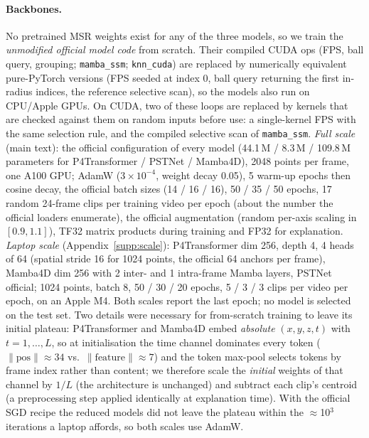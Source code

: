 \paragraph{Backbones.}
No pretrained MSR weights exist for any of the three models, so we train the \emph{unmodified official model code} from scratch. Their compiled CUDA ops (FPS, ball query, grouping; \texttt{mamba\_ssm}; \texttt{knn\_cuda}) are replaced by numerically equivalent pure-PyTorch versions (FPS seeded at index 0, ball query returning the first in-radius indices, the reference selective scan), so the models also run on CPU/Apple GPUs. On CUDA, two of these loops are replaced by kernels that are checked against them on random inputs before use: a single-kernel FPS with the same selection rule, and the compiled selective scan of \texttt{mamba\_ssm}. \emph{Full scale} (main text): the official configuration of every model (44.1\,M / 8.3\,M / 109.8\,M parameters for P4Transformer / PSTNet / Mamba4D), 2048 points per frame, one A100 GPU; AdamW ($3{\times}10^{-4}$, weight decay 0.05), 5 warm-up epochs then cosine decay, the official batch sizes (14 / 16 / 16), 50 / 35 / 50 epochs, 17 random 24-frame clips per training video per epoch (about the number the official loaders enumerate), the official augmentation (random per-axis scaling in $[0.9,1.1]$), TF32 matrix products during training and FP32 for explanation. \emph{Laptop scale} (Appendix~\ref{supp:scale}): P4Transformer dim 256, depth 4, 4 heads of 64 (spatial stride 16 for 1024 points, \ie the official 64 anchors per frame), Mamba4D dim 256 with 2 inter- and 1 intra-frame Mamba layers, PSTNet official; 1024 points, batch 8, 50 / 30 / 20 epochs, 5 / 3 / 3 clips per video per epoch, on an Apple M4. Both scales report the last epoch; no model is selected on the test set. Two details were necessary for from-scratch training to leave its initial plateau: P4Transformer and Mamba4D embed \emph{absolute} $(x,y,z,t)$ with $t=1,\dots,L$, so at initialisation the time channel dominates every token ($\|\text{pos}\|\approx34$ vs.\ $\|\text{feature}\|\approx7$) and the token max-pool selects tokens by frame index rather than content; we therefore scale the \emph{initial} weights of that channel by $1/L$ (the architecture is unchanged) and subtract each clip's centroid (a preprocessing step applied identically at explanation time). With the official SGD recipe the reduced models did not leave the plateau within the $\approx$10$^3$ iterations a laptop affords, so both scales use AdamW.

